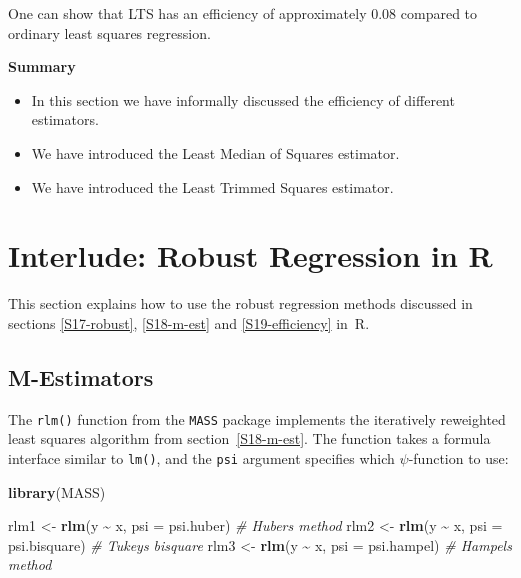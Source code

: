 \documentclass[
  a4paper,
]{article}
\newenvironment{Shaded}{\begin{snugshade}}{\end{snugshade}}
\newcommand{\AttributeTok}[1]{\textcolor[rgb]{0.13,0.29,0.53}{#1}}
\newcommand{\CommentTok}[1]{\textcolor[rgb]{0.56,0.35,0.01}{\textit{#1}}}
\newcommand{\FunctionTok}[1]{\textcolor[rgb]{0.13,0.29,0.53}{\textbf{#1}}}
\newcommand{\NormalTok}[1]{#1}
\newcommand{\OtherTok}[1]{\textcolor[rgb]{0.56,0.35,0.01}{#1}}
\newcommand{\SpecialCharTok}[1]{\textcolor[rgb]{0.81,0.36,0.00}{\textbf{#1}}}
\providecommand{\tightlist}{%
  \setlength{\itemsep}{0pt}\setlength{\parskip}{0pt}}
\theoremstyle{definition}
\theoremstyle{definition}
\theoremstyle{definition}
\theoremstyle{definition}
\theoremstyle{remark}
\begin{document}
One can show that LTS has an efficiency of approximately \(0.08\)
compared to ordinary least squares regression.

\textbf{Summary}

\begin{itemize}
\tightlist
\item
  In this section we have informally discussed the efficiency of different estimators.
\item
  We have introduced the Least Median of Squares estimator.
\item
  We have introduced the Least Trimmed Squares estimator.
\end{itemize}

\clearpage

\section*{Interlude: Robust Regression in R}\label{I04-robust}

This section explains how to use the robust regression methods discussed in
sections \ref{S17-robust}, \ref{S18-m-est} and \ref{S19-efficiency} in~R.

\subsection*{M-Estimators}\label{m-estimators}

The \texttt{rlm()} function from the \texttt{MASS} package implements the iteratively
reweighted least squares algorithm from section~\ref{S18-m-est}. The
function takes a formula interface similar to \texttt{lm()}, and the \texttt{psi} argument
specifies which \(\psi\)-function to use:

\begin{Shaded}
\begin{Highlighting}[]
\FunctionTok{library}\NormalTok{(MASS)}

\NormalTok{rlm1 }\OtherTok{\textless{}{-}} \FunctionTok{rlm}\NormalTok{(y }\SpecialCharTok{\textasciitilde{}}\NormalTok{ x, }\AttributeTok{psi =}\NormalTok{ psi.huber)      }\CommentTok{\# Huber\textquotesingle{}s method}
\NormalTok{rlm2 }\OtherTok{\textless{}{-}} \FunctionTok{rlm}\NormalTok{(y }\SpecialCharTok{\textasciitilde{}}\NormalTok{ x, }\AttributeTok{psi =}\NormalTok{ psi.bisquare)   }\CommentTok{\# Tukey\textquotesingle{}s bisquare}
\NormalTok{rlm3 }\OtherTok{\textless{}{-}} \FunctionTok{rlm}\NormalTok{(y }\SpecialCharTok{\textasciitilde{}}\NormalTok{ x, }\AttributeTok{psi =}\NormalTok{ psi.hampel)     }\CommentTok{\# Hampel\textquotesingle{}s method}
\end{Highlighting}
\end{Shaded}
\end{document}
